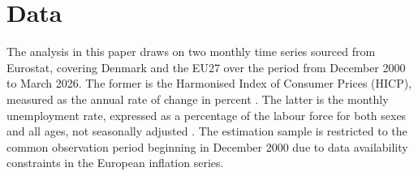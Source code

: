 


\chapter{Data}\label{sec:data}
The analysis in this paper draws on two monthly time series sourced from Eurostat, covering Denmark and the EU27 over the period from December 2000 to March 2026. The former is the Harmonised Index of Consumer Prices (HICP), measured as the annual rate of change in percent \parencite{eurostat_hicp}. The latter is the monthly unemployment rate, expressed as a percentage of the labour force for both sexes and all ages, not seasonally adjusted \parencite{eurostat_unemployment}. The estimation sample is restricted to the common observation period beginning in December 2000 due to data availability constraints in the European inflation series.

